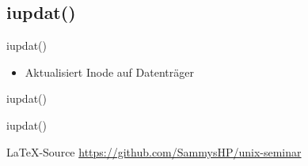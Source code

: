 \documentclass{beamer}
\begin{document}


\subsection{iupdat()}

\begin{frame}{iupdat()}
    \begin{itemize}
        \item Aktualisiert Inode auf Datenträger
    \end{itemize}
\end{frame}

\begin{frame}{iupdat()}
\end{frame}

\begin{frame}{iupdat()}
\end{frame}




\begin{frame}
    \begin{block}{\LaTeX-Source}
        \centering
        \bigskip
        \url{https://github.com/SammysHP/unix-seminar}
        \bigskip
    \end{block}
\end{frame}
\end{document}
